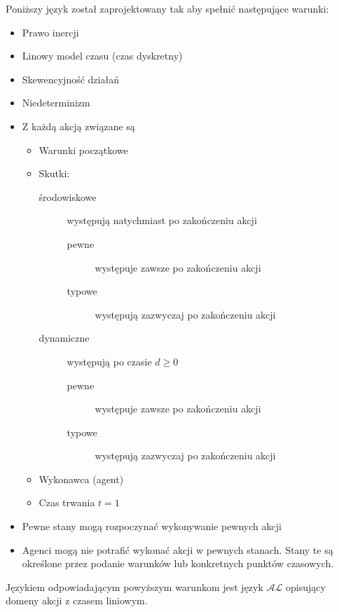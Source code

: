 Poniższy język został zaprojektowany tak aby spełnić następujące warunki:
\begin{itemize}
	\item Prawo inercji
	\item Linowy model czasu (czas dyskretny)
	\item Skewencyjność działań
	\item Niedeterminizm
	\item Z każdą akcją związane są
		\begin{itemize}
			\item Warunki początkowe
			\item Skutki:
				\begin{description}
					\item[środowiskowe] występują natychmiast po zakończeniu akcji
						\begin{description}
							\item[pewne] występuje zawsze po zakończeniu akcji
							\item[typowe] występują zazwyczaj po zakończeniu akcji
						\end{description}
					\item[dynamiczne] występują po czasie $d \geqslant 0$
						\begin{description}
							\item[pewne] występuje zawsze po zakończeniu akcji
							\item[typowe] występują zazwyczaj po zakończeniu akcji
						\end{description}
				\end{description}
			\item Wykonawca (agent)
			\item Czas trwania $t = 1$
		\end{itemize}	
	\item Pewne stany mogą rozpoczynać wykonywanie pewnych akcji
	\item Agenci mogą nie potrafić wykonać akcji w pewnych stanach. Stany te są określone przez podanie
	warunków lub konkretnych punktów czasowych.	
\end{itemize}
Językiem odpowiadającym powyższym warunkom jest język $\mathcal{AL}$ 
opisujący domeny akcji z czasem liniowym.

